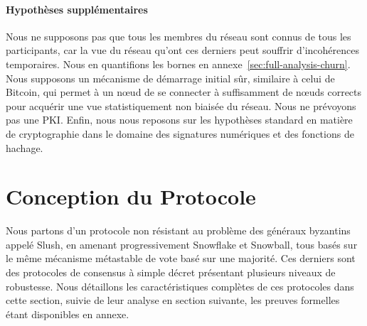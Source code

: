 \documentclass[letterpaper,twocolumn,10pt]{article}
\newcommand{\editinsert}[1]{{\color{blue}#1}}
\theoremstyle{definition}
\begin{document}
\paragraph{Hypothèses supplémentaires}
Nous ne supposons pas que tous les membres du réseau sont connus de tous les participants, car la vue du réseau qu'ont ces derniers peut souffrir d'incohérences temporaires.
Nous en quantifions les bornes en annexe~\ref{sec:full-analysis-churn}.
Nous supposons un mécanisme de démarrage initial sûr, similaire à celui de Bitcoin, qui permet à un nœud de se connecter à suffisamment de nœuds corrects pour acquérir une vue statistiquement non biaisée du réseau.
Nous ne prévoyons pas une PKI\@.
Enfin, nous nous reposons sur les hypothèses standard en matière de cryptographie dans le domaine des signatures numériques et des fonctions de hachage.


\section{Conception du Protocole}\label{sec:protocol}
Nous partons d'un protocole non résistant au problème des généraux byzantins appelé Slush, en amenant
progressivement Snowflake et Snowball, tous basés sur le même mécanisme métastable de vote basé sur une majorité.
Ces derniers sont des protocoles de consensus à simple décret présentant plusieurs niveaux de robustesse. Nous
détaillons les caractéristiques complètes de ces protocoles dans cette section, suivie de leur analyse en section
suivante, les preuves formelles étant disponibles en annexe.

\end{document}
